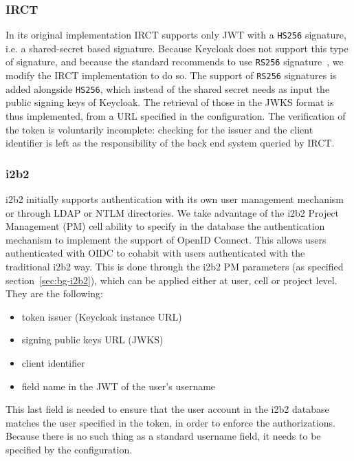 \subsubsection{IRCT}

In its original implementation IRCT supports only JWT with a \verb|HS256| signature, i.e. a shared-secret based signature. 
Because Keycloak does not support this type of signature, and because the standard recommends to use \verb|RS256| signature~\cite{rfc:oidc}, we modify the IRCT implementation to do so. 
The support of \verb|RS256| signatures is added alongside \verb|HS256|, which instead of the shared secret needs as input the public signing keys of Keycloak.
The retrieval of those in the JWKS format is thus implemented, from a URL specified in the configuration.
The verification of the token is voluntarily incomplete: checking for the issuer and the client identifier is left as the responsibility of the back end system queried by IRCT.

\subsubsection{i2b2}

i2b2 initially supports authentication with its own user management mechanism or through LDAP or NTLM directories.
We take advantage of the i2b2 Project Management (PM) cell ability to specify in the database the authentication mechanism to implement the support of OpenID Connect.
This allows users authenticated with OIDC to cohabit with users authenticated with the traditional i2b2 way.
This is done through the i2b2 PM parameters (as specified section~\ref{sec:bg-i2b2}), which can be applied either at user, cell or project level. 
They are the following:

\begin{itemize}
    \item token issuer (Keycloak instance URL)
    \item signing public keys URL (JWKS)
    \item client identifier
    \item field name in the JWT of the user's username
\end{itemize}

This last field is needed to ensure that the user account in the i2b2 database matches the user specified in the token, in order to enforce the authorizations.
Because there is no such thing as a standard username field, it needs to be specified by the configuration.

